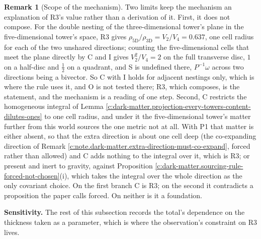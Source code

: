 \documentclass[11pt]{article}
\theoremstyle{definition}
\newtheorem{remark}[theorem]{Remark}
\theoremstyle{plain}
\begin{document}
\begin{remark}[Scope of the mechanism]\label{c:note.dark-matter.scope-mechanism}
Two limits keep the mechanism an explanation of R3's value rather than a derivation of it. First, it does not compose. For the double nesting of the three-dimensional tower's plane in the five-dimensional tower's space, R3 gives $\rho_{5\mathrm{D}}/\rho_{3\mathrm{D}} = V_{2}/V_{4} = 0.637$, one cell radius for each of the two unshared directions; counting the five-dimensional cells that meet the plane directly by C and I gives $V_{2}^{2}/V_{4} = 2$ on the full transverse disc, $1$ on a half-disc and $\tfrac{1}{2}$ on a quadrant, and S is undefined there, $P^{-1}\omega$ across two directions being a bivector. So C with I holds for adjacent nestings only, which is where the rule uses it, and O is not tested there; R3, which composes, is the statement, and the mechanism is a reading of one step. Second, C restricts the homogeneous integral of Lemma \ref{c:dark-matter.projection-every-towers-content-dilutes-ones} to one cell radius, and under it the five-dimensional tower's matter further from this world sources the one metric not at all. With P1 that matter is either absent, so that the extra direction is about one cell deep (the co-expanding direction of Remark \ref{c:note.dark-matter.extra-direction-must-co-expand}, forced rather than allowed) and C adds nothing to the integral over it, which is R3; or present and inert to gravity, against Proposition \ref{c:dark-matter.sourcing-rule-forced-not-chosen}(i), which takes the integral over the whole direction as the only covariant choice. On the first branch C is R3; on the second it contradicts a proposition the paper calls forced. On neither is it a foundation.
\end{remark}

\label{c:note.dark-matter.setting-thickness-contact-mechanism-3}
\textbf{Sensitivity.} The rest of this subsection records the total's dependence on the thickness taken as a parameter, which is where the observation's constraint on R3 lives.
\end{document}
